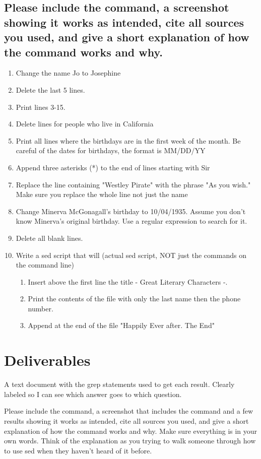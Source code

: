 \documentclass[12pt]{article}
\begin{document}
\subsection*{Please include the command, a screenshot showing it works as intended, cite all sources you used, and give a short explanation of how the command works and why.}
    \begin{enumerate}
        \item Change the name Jo to Josephine
        \item Delete the last 5 lines.
        \item Print lines 3-15.
        \item Delete lines for people who live in California
        \item Print all lines where the birthdays are in the first week of the month.  Be careful of the dates for birthdays, the format is MM/DD/YY
        \item Append three asterisks (*) to the end of lines starting with Sir
        \item Replace the line containing "Westley Pirate" with the phrase "As you wish."  Make sure you replace the whole line not just the name
        \item Change Minerva McGonagall's birthday to 10/04/1935. Assume you don't know Minerva's original birthday. Use a regular expression to search for it.
        \item Delete all blank lines.
        \item Write a sed script that will  (actual sed script, NOT just the commands on the command line)
        \begin{enumerate}
            \item Insert above the first line the title  - Great Literary Characters -.
            \item Print the contents of the file with only the last name then the phone number.
            \item Append at the end of the file "Happily Ever after. The End"
        \end{enumerate}


    \end{enumerate}



\section*{Deliverables}
A text document with the grep statements used to get each result.  Clearly labeled so I can see which answer goes to which question.


Please include the command, a screenshot that includes the command and a few results showing it works as intended, cite all sources you used, and give a short explanation of how the command works and why. Make sure everything is in your own words.  Think of the explanation as you trying to walk someone through how to use sed when they haven't heard of it before.
\end{document}
